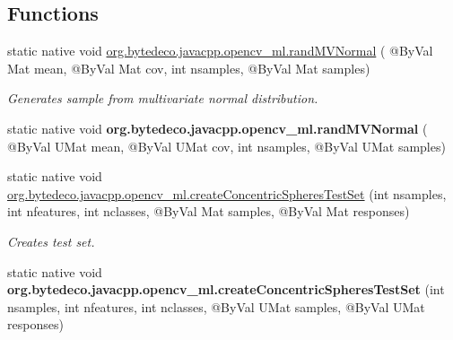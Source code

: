 \subsection*{Functions}
\begin{DoxyCompactItemize}
\item 
static native void \hyperlink{group__ml_gaeb2cdd5950f92be2f699b6ad5cf4a9ba}{org.\+bytedeco.\+javacpp.\+opencv\+\_\+ml.\+rand\+M\+V\+Normal} ( @By\+Val Mat mean, @By\+Val Mat cov, int nsamples, @By\+Val Mat samples)
\begin{DoxyCompactList}\small\item\em Generates {\itshape sample} from multivariate normal distribution. \end{DoxyCompactList}\item 
\mbox{\label{group__ml_gac1d15c2c87890de2e0af2b50ef75e917}} 
static native void {\bfseries org.\+bytedeco.\+javacpp.\+opencv\+\_\+ml.\+rand\+M\+V\+Normal} ( @By\+Val U\+Mat mean, @By\+Val U\+Mat cov, int nsamples, @By\+Val U\+Mat samples)
\item 
\mbox{\label{group__ml_ga800b1310714c638042e7cc627abab847}} 
static native void \hyperlink{group__ml_ga800b1310714c638042e7cc627abab847}{org.\+bytedeco.\+javacpp.\+opencv\+\_\+ml.\+create\+Concentric\+Spheres\+Test\+Set} (int nsamples, int nfeatures, int nclasses, @By\+Val Mat samples, @By\+Val Mat responses)
\begin{DoxyCompactList}\small\item\em Creates test set. \end{DoxyCompactList}\item 
\mbox{\label{group__ml_gaf5f84095e8dc397d9fcb66b5ffdad5e9}} 
static native void {\bfseries org.\+bytedeco.\+javacpp.\+opencv\+\_\+ml.\+create\+Concentric\+Spheres\+Test\+Set} (int nsamples, int nfeatures, int nclasses, @By\+Val U\+Mat samples, @By\+Val U\+Mat responses)
\end{DoxyCompactItemize}
